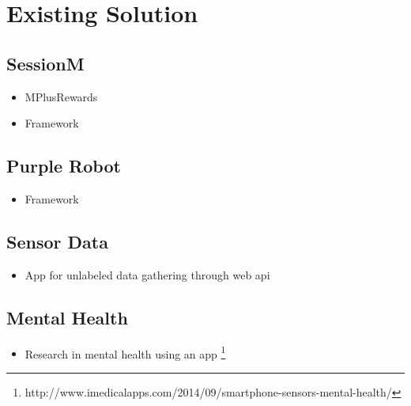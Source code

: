 
\section{Existing Solution}
\label{sec:existing_solution}

\subsection{SessionM}
\label{sub:sessionm}

\begin{itemize}
	\item MPlusRewards
	\item Framework
\end{itemize}


\subsection{Purple Robot}
\label{sub:purple_robot}

\begin{itemize}
	\item Framework
\end{itemize}

\subsection{Sensor Data} 
\label{sub:sensor_data}

\begin{itemize}
	\item App for unlabeled data gathering through web api
\end{itemize}

\subsection{Mental Health} %
\label{sub:mental_health}

\begin{itemize}
    \item Research in mental health using an app \footnote{http://www.imedicalapps.com/2014/09/smartphone-sensors-mental-health/}
\end{itemize}





